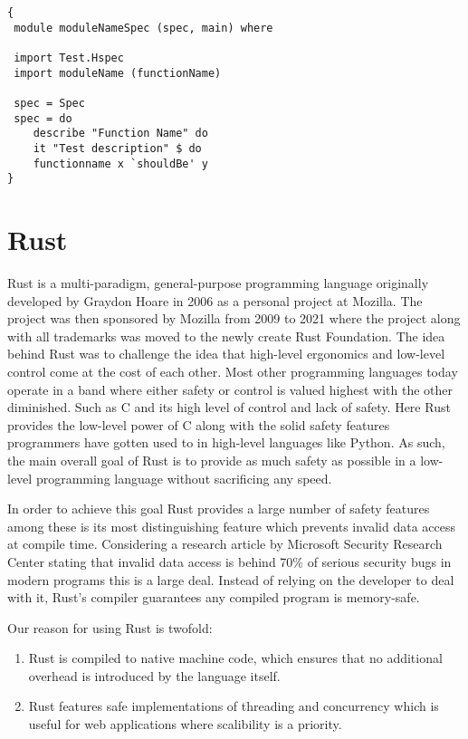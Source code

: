 \begin{lstlisting}[language=CSharp, caption={An example of a Hspec Test.}, label={lst:HspecTestExample}]
{
 module moduleNameSpec (spec, main) where

 import Test.Hspec
 import moduleName (functionName)
 
 spec = Spec
 spec = do
 	describe "Function Name" do
 	it "Test description" $ do
	functionname x `shouldBe' y
}
\end{lstlisting}

\section*{Rust}
Rust is a multi-paradigm, general-purpose programming language originally developed by Graydon Hoare in 2006 as a personal project at Mozilla. 
The project was then sponsored by Mozilla from 2009 to 2021 where the project along with all trademarks was moved to the newly create Rust Foundation. 
The idea behind Rust was to challenge the idea that high-level ergonomics and low-level control come at the cost of each other\cite{Rust_Book}.
Most other programming languages today operate in a band where either safety or control is valued highest with the other diminished. Such as C and its high level of control and lack of safety. 
Here Rust provides the low-level power of C along with the solid safety features programmers have gotten used to in high-level languages like Python. 
As such, the main overall goal of Rust is to provide as much safety as possible in a low-level programming language without sacrificing any speed\cite{Rust_in_Action}.

In order to achieve this goal Rust provides a large number of safety features among these is its most distinguishing feature which prevents invalid data access at compile time. 
Considering a research article by Microsoft Security Research Center stating that invalid data access is behind 70\% of serious security bugs in modern programs this is a large deal\cite{Safe_Systems_Languages}. 
Instead of relying on the developer to deal with it, Rust's compiler guarantees any compiled program is memory-safe.

Our reason for using Rust is twofold: 
\begin{enumerate}
    \item Rust is compiled to native machine code, which ensures that no additional overhead is introduced by the language itself.
    \item Rust features safe implementations of threading and concurrency which is useful for web applications where scalibility is a priority.
\end{enumerate}

